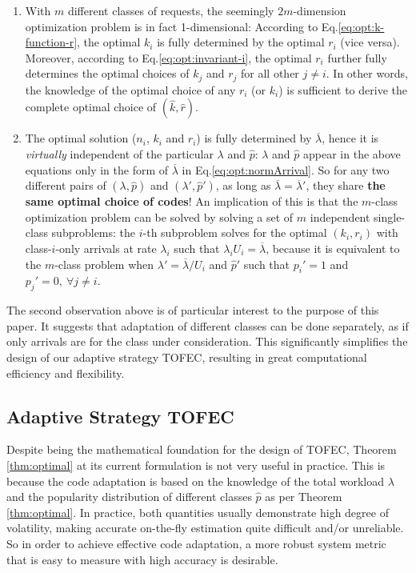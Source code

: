 \documentclass[journal]{IEEEtran}
\newcommand{\ourproposal}{TOFEC\xspace}
\newcommand{\ourscheme}{TOFEC\xspace}
\newcommand{\dimVec}{\hat{k}}
\newcommand{\compVec}{\hat{p}}
\newcommand{\rateVec}{\hat{r}}
\newcommand{\normArrival}{\overline{\lambda}}
\begin{document}
\begin{enumerate}
\item With $m$ different classes of requests, the seemingly $2m$-dimension optimization problem is in fact 1-dimensional: According to Eq.\ref{eq:opt:k-function-r}, the optimal $k_i$ is fully determined by the optimal $r_i$ (vice versa). Moreover, according to Eq.\ref{eq:opt:invariant-i}, the optimal $r_i$ further fully determines the optimal choices of $k_j$ and $r_j$ for all other $j\neq i$. In other words, the knowledge of the optimal choice of any $r_i$ (or $k_i$) is sufficient to derive the complete optimal choice of $(\dimVec,\rateVec)$.

\item The optimal solution ($n_i$, $k_i$ and $r_i$) is fully determined by $\normArrival$, hence it is {\em virtually} independent of the particular $\lambda$ and $\compVec$: $\lambda$ and $\compVec$ appear in the above equations only in the form of $\normArrival$ in Eq.\ref{eq:opt:normArrival}. So for any two different pairs of $(\lambda,\compVec)$ and $(\lambda',\compVec')$, as long as $\normArrival = \normArrival'$, they share {\bf the same optimal choice of codes}! An implication of this is that the $m$-class optimization problem can be solved by solving a set of $m$ independent single-class subproblems: the $i$-th subproblem solves for the optimal $(k_i,r_i)$ with class-$i$-only arrivals at rate $\lambda_i$ such that $\lambda_i U_i = \normArrival$, because it is equivalent to the $m$-class problem when $\lambda'=\normArrival/U_i$ and $\compVec'$ such that $p_i' = 1$ and $p_j'=0,~ \forall j\neq i$. 
\end{enumerate}
The second observation above is of particular interest to the purpose of this paper. It suggests that adaptation of different classes can be done separately, as if only arrivals are for the class under consideration. This significantly simplifies the design of our adaptive strategy \ourscheme, resulting in great computational efficiency and flexibility.

\subsection{Adaptive Strategy \ourproposal}
\label{ssec:ana:adaptive}

Despite being the mathematical foundation for the design of \ourproposal, Theorem \ref{thm:optimal} at its current formulation is not very useful in practice. This is because the code adaptation is based on the knowledge of the total workload $\lambda$ and  the popularity distribution of different classes $\compVec$ as per Theorem \ref{thm:optimal}. In practice, both quantities usually demonstrate high degree of volatility, making accurate on-the-fly estimation quite difficult and/or unreliable. So in order to achieve effective code adaptation, a more robust system metric that is easy to measure with high accuracy is desirable. 
\end{document}
